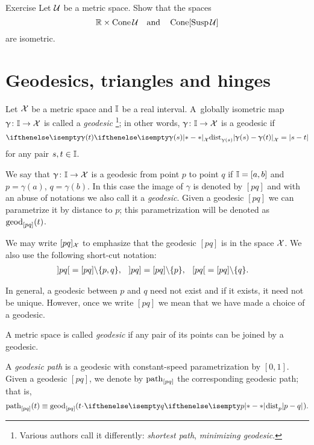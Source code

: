 \begin{thm}{Exercise}\label{ex:product-cone}
Let $\mathcal{U}$ be a metric space.
Show that the spaces 
\[\RR\times \Cone\spc{U}\quad\text{and}\quad\Cone[\Susp\spc{U}]\]
are  isometric.
\end{thm}




\section{Geodesics, triangles and hinges}
\label{sec:geods}

Let $\mathcal{X}$ be a metric space 
and $\II$\index{$\II$} be a real interval. 
A~globally isometric map $\gamma\:\II\to \spc{X}$ is called a \emph{geodesic}%
\footnote{Various authors call it differently: {}\emph{shortest path}, {}\emph{minimizing geodesic}.}; 
in other words, $\gamma\:\II\to \spc{X}$ is a geodesic if 
\[\dist{\gamma(s)}{\gamma(t)}{\spc{X}}=|s-t|\]
for any pair $s,t\in \II$.

We say that  $\gamma\:\II\to \spc{X}$ is a geodesic from point $p$ to point $q$ if 
$\mathbb{I}=[a,b]$ and $p=\gamma(a)$, $q=\gamma(b)$. %
In this case the image of $\gamma$ is denoted by $[p q]$\index{$[{*}{*}]$} and with an abuse of notations  we also call it a \emph{geodesic}.
Given a geodesic $[pq]$ we can parametrize it by distance to $p$;
this parametrization will be denoted as $\mathrm{geod}_{[p q]}(t)$.


We may write $[p q]_{\mathcal{X}}$ 
to emphasize that the geodesic $[p q]$ is in the space  ${\mathcal{X}}$.
We also use the following short-cut notation:
\begin{align*}
\hskip-0.1em\left] p q \right[&=[pq]\backslash\{p,q\},
&
\hskip-0.1em\left] p q \right]&=[pq]\backslash\{p\},
&
\hskip-0.1em\left[ p q \right[&=[pq]\backslash\{q\}.
\end{align*}



In general, a geodesic between $p$ and $q$ need not exist and if it exists, it need not  be unique.  
However,  once we write $[p q]$ we mean that we have  made a choice of a geodesic.

A metric space is called \emph{geodesic} if any pair of its points can be joined by a geodesic. 


A \emph{geodesic path} is a geodesic with constant-speed parametrization by $[0,1]$.
Given a geodesic $[p q]$,
we denote by $\mathrm{path}_{[pq]}$ the corresponding geodesic path;
that is,
$$\geodpath_{[pq]}(t)\z\equiv\geod_{[pq]}(t\cdot\dist[{{}}]{p}{q}{}).$$

